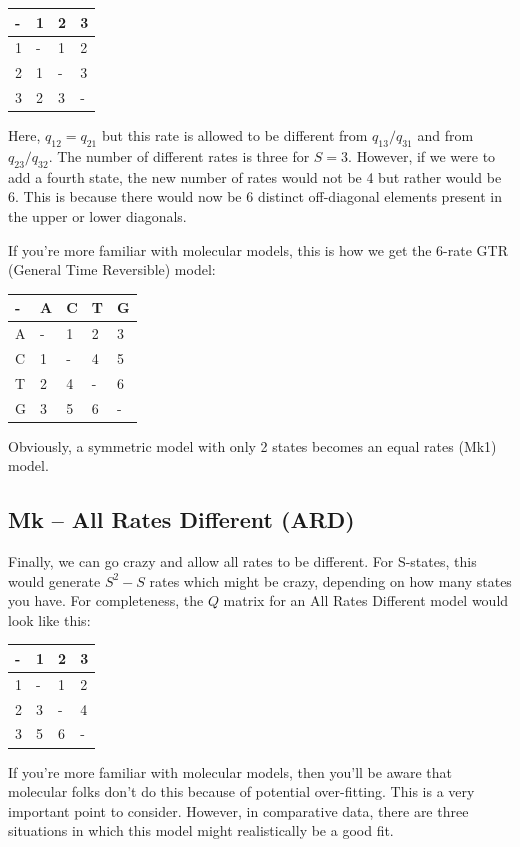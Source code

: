 \documentclass[]{book}
\begin{document}
\begin{longtable}[]{@{}llll@{}}
\toprule
- & 1 & 2 & 3\tabularnewline
\midrule
\endhead
1 & - & 1 & 2\tabularnewline
2 & 1 & - & 3\tabularnewline
3 & 2 & 3 & -\tabularnewline
\bottomrule
\end{longtable}

Here, \(q_{12} = q_{21}\) but this rate is allowed to be different from
\(q_{13}/q_{31}\) and from \(q_{23}/q_{32}\). The number of different
rates is three for \(S = 3\). However, if we were to add a fourth state,
the new number of rates would not be 4 but rather would be 6. This is
because there would now be 6 distinct off-diagonal elements present in
the upper or lower diagonals.

If you're more familiar with molecular models, this is how we get the
6-rate GTR (General Time Reversible) model:

\begin{longtable}[]{@{}lllll@{}}
\toprule
- & A & C & T & G\tabularnewline
\midrule
\endhead
A & - & 1 & 2 & 3\tabularnewline
C & 1 & - & 4 & 5\tabularnewline
T & 2 & 4 & - & 6\tabularnewline
G & 3 & 5 & 6 & -\tabularnewline
\bottomrule
\end{longtable}

Obviously, a symmetric model with only 2 states becomes an equal rates
(Mk1) model.

\subsection{Mk -- All Rates Different
(ARD)}\label{mk-all-rates-different-ard}

Finally, we can go crazy and allow all rates to be different. For
S-states, this would generate \(S^2 - S\) rates which might be crazy,
depending on how many states you have. For completeness, the \(Q\)
matrix for an All Rates Different model would look like this:

\begin{longtable}[]{@{}llll@{}}
\toprule
- & 1 & 2 & 3\tabularnewline
\midrule
\endhead
1 & - & 1 & 2\tabularnewline
2 & 3 & - & 4\tabularnewline
3 & 5 & 6 & -\tabularnewline
\bottomrule
\end{longtable}

If you're more familiar with molecular models, then you'll be aware that
molecular folks don't do this because of potential over-fitting. This is
a very important point to consider. However, in comparative data, there
are three situations in which this model might realistically be a good
fit.
\end{document}
